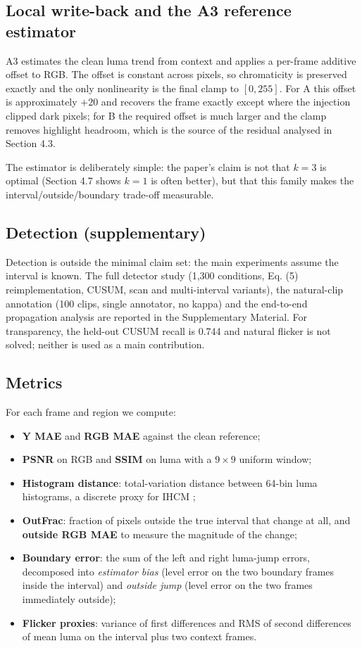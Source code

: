 \documentclass[twocolumn,10pt]{svjour3}
\begin{document}
\subsection{Local write-back and the A3 reference estimator}

A3 estimates the clean luma trend from context and applies a per-frame additive offset to RGB. The offset is constant across pixels, so chromaticity is preserved exactly and the only nonlinearity is the final clamp to $[0,255]$. For A this offset is approximately $+20$ and recovers the frame exactly except where the injection clipped dark pixels; for B the required offset is much larger and the clamp removes highlight headroom, which is the source of the residual analysed in Section 4.3.


The estimator is deliberately simple: the paper's claim is not that $k{=}3$ is optimal (Section 4.7 shows $k{=}1$ is often better), but that this family makes the interval/outside/boundary trade-off measurable.


\subsection{Detection (supplementary)}

Detection is outside the minimal claim set: the main experiments assume the interval is known. The full detector study (1,300 conditions, Eq. (5) reimplementation, CUSUM, scan and multi-interval variants), the natural-clip annotation (100 clips, single annotator, no kappa) and the end-to-end propagation analysis are reported in the Supplementary Material. For transparency, the held-out CUSUM recall is 0.744 and natural flicker is not solved; neither is used as a main contribution.


\subsection{Metrics}

For each frame and region we compute:


\begin{itemize}
\item \textbf{Y MAE} and \textbf{RGB MAE} against the clean reference;
\item \textbf{PSNR} on RGB and \textbf{SSIM} on luma with a $9\times9$ uniform window;
\item \textbf{Histogram distance}: total-variation distance between 64-bin luma histograms, a discrete proxy for IHCM \cite{chen2024illumination};
\item \textbf{OutFrac}: fraction of pixels outside the true interval that change at all, and \textbf{outside RGB MAE} to measure the magnitude of the change;
\item \textbf{Boundary error}: the sum of the left and right luma-jump errors, decomposed into \emph{estimator bias} (level error on the two boundary frames inside the interval) and \emph{outside jump} (level error on the two frames immediately outside);
\item \textbf{Flicker proxies}: variance of first differences and RMS of second differences of mean luma on the interval plus two context frames.
\end{itemize}
\end{document}
